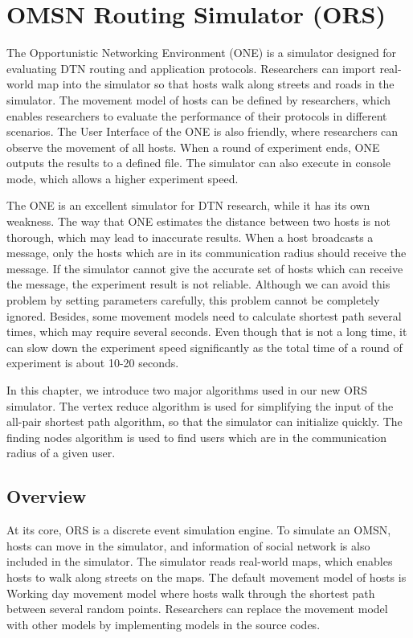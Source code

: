 


\chapter{OMSN Routing Simulator (ORS)}
\label{OPS}

\noindent The Opportunistic Networking Environment (ONE) \cite{C35} is a simulator designed for evaluating DTN routing and application protocols. Researchers can import real-world map into the simulator so that hosts walk along streets and roads in the simulator. The movement model of hosts can be defined by researchers, which enables researchers to evaluate the performance of their protocols in different scenarios. The User Interface of the ONE is also friendly, where researchers can observe the movement of all hosts. When a round of experiment ends, ONE outputs the results to a defined file. The simulator can also execute in console mode, which allows a higher experiment speed.

The ONE is an excellent simulator for DTN research, while it has its own weakness. The way that ONE estimates the distance between two hosts is not thorough, which may lead to inaccurate results. When a host broadcasts a message, only the hosts which are in its communication radius should receive the message. If the simulator cannot give the accurate set of hosts which can receive the message, the experiment result is not reliable. Although we can avoid this problem by setting parameters carefully, this problem cannot be completely ignored. Besides, some movement models need to calculate shortest path several times, which may require several seconds. Even though that is not a long time, it can slow down the experiment speed significantly as the total time of a round of experiment is about 10-20 seconds. 

In this chapter, we introduce two major algorithms used in our new ORS simulator. The vertex reduce algorithm is used for simplifying the input of the all-pair shortest path algorithm, so that the simulator can initialize quickly. The finding nodes algorithm is used to find users which are in the communication radius of a given user.

\section{Overview}
At its core, ORS is a discrete event simulation engine. To simulate an OMSN, hosts can move in the simulator, and information of social network is also included in the simulator. The simulator reads real-world maps, which enables hosts to walk along streets on the maps. The default movement model of hosts is Working day movement model \cite{C32} where hosts walk through the shortest path between several random points. Researchers can replace the movement model with other models by implementing models in the source codes.

